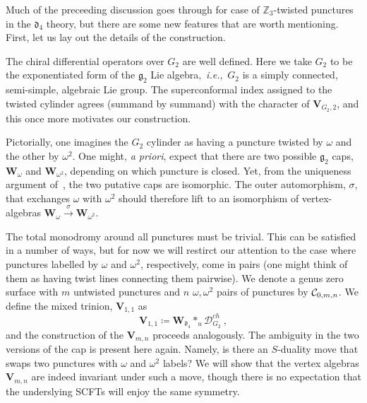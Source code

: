 \documentclass[a4paper]{article}
\def\IZ{\mathbb{Z}}
\def\CC{{\cal C}}
\def\df{\mathfrak{d}}
\def\gf{\mathfrak{g}}
\def \ie{{\it i.e.}}
\def\D{\mathcal{D}^{ch}}
\def\W{\mathbf{W}}
\def\V{\mathbf{V}}
\begin{document}
Much of the preceeding discussion goes through for case of $\IZ_3$-twisted punctures in the $\df_4$ theory, but there are some new features that are worth mentioning. First, let us lay out the details of the construction.

The chiral differential operators over $G_2$ are well defined. Here we take $G_2$ to be the exponentiated form of the $\gf_2$ Lie algebra,~\ie,~$G_2$ is a simply connected, semi-simple, algebraic Lie group. The superconformal index assigned to the twisted cylinder agrees (summand by summand) with the character of $\V_{G_2,2}$, and this once more motivates our construction.

Pictorially, one imagines the $G_2$ cylinder as having a puncture twisted by $\omega$ and the other by $\omega^2$. One might, \textit{a priori}, expect that there are two possible $\gf_2$ caps, $\W_\omega$ and $\W_{\omega^2}$, depending on which puncture is closed. Yet, from the uniqueness argument of~\cite{Arakawa:2018egx}, the two putative caps are isomorphic. The outer automorphism, $\sigma$, that exchanges $\omega$ with $\omega^2$ should therefore lift to an isomorphism of vertex-algebras $\W_{\omega}\xrightarrow{\sigma}\W_{\omega^2}$.

The total monodromy around all punctures must be trivial. This can be satisfied in a number of ways, but for now we will restirct our attention to the case where punctures labelled by $\omega$ and $\omega^2$, respectively, come in pairs (one might think of them as having twist lines connecting them pairwise). We denote a genus zero surface with $m$ untwisted punctures and $n$ $\omega,\omega^2$ pairs of punctures by $\CC_{0,m,n}$. We define the mixed trinion, $\V_{1,1}$ as
\begin{equation}
    \V_{1,1} \coloneqq \W_{\df_4}\ast_u\D_{G_2}~,
\end{equation}
and the construction of the $\V_{m,n}$ proceeds analogously. The ambiguity in the two versions of the cap is present here again. Namely, is there an $S$-duality move that swaps two punctures with $\omega$ and $\omega^2$ labels? We will show that the vertex algebras $\V_{m,n}$ are indeed invariant under such a move, though there is no expectation that the underslying SCFTs will enjoy the same symmetry.
\end{document}
